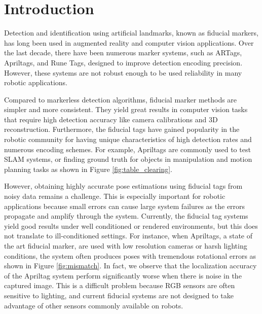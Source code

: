 \section{Introduction}
\label{sec:intro}

Detection and identification using artificial landmarks, known as fiducial markers, has long been used in augmented reality and computer vision applications. Over the last decade, there have been numerous marker systems, such as ARTags, Apriltags, and Rune Tags, designed to improve detection encoding precision. However, these systems are not robust enough to be used reliability in many robotic applications.

Compared to markerless detection algorithms, fiducial marker methods are simpler and more consistent. They yield great results in computer vision tasks that require high detection accuracy like camera calibrations and 3D reconstruction. Furthermore, the fiducial tags have gained popularity in the robotic community for having unique characteristics of high detection rates and numerous encoding schemes. For example, Apriltags are commonly used to test SLAM systems, or finding ground truth for objects in manipulation and motion planning tasks as shown in Figure \ref{fig:table_clearing}. 

However, obtaining highly accurate pose estimations using fiducial tags from noisy data remains a challenge. This is especially important for robotic applications because small errors can cause large system failures as the errors propagate and amplify through the system. Currently, the fiducial tag systems yield good results under well conditioned or rendered environments, but this does not translate to ill-conditioned settings. For instance, when Apriltags, a state of the art fiducial marker, are used with low resolution cameras or harsh lighting conditions, the system often produces poses with tremendous rotational errors as shown in Figure \ref{fig:mismatch}. In fact, we observe that the localization accuracy of the Apriltag system perform significantly worse when there is noise in the captured image. This is a difficult problem because RGB sensors are often sensitive to lighting, and current fiducial systems are not designed to take advantage of other sensors commonly available on robots.


